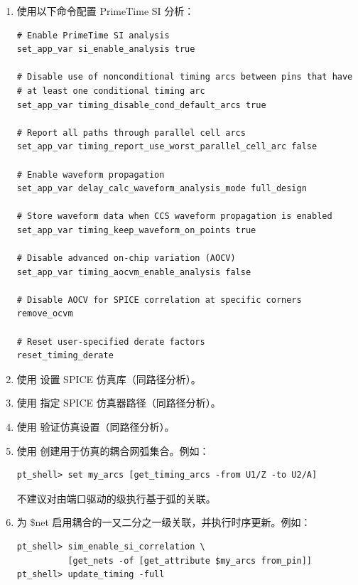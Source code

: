 \begin{enumerate}
  \item 使用以下命令配置 PrimeTime SI 分析：
\begin{lstlisting}
# Enable PrimeTime SI analysis
set_app_var si_enable_analysis true

# Disable use of nonconditional timing arcs between pins that have
# at least one conditional timing arc
set_app_var timing_disable_cond_default_arcs true

# Report all paths through parallel cell arcs
set_app_var timing_report_use_worst_parallel_cell_arc false

# Enable waveform propagation
set_app_var delay_calc_waveform_analysis_mode full_design

# Store waveform data when CCS waveform propagation is enabled
set_app_var timing_keep_waveform_on_points true

# Disable advanced on-chip variation (AOCV)
set_app_var timing_aocvm_enable_analysis false

# Disable AOCV for SPICE correlation at specific corners
remove_ocvm

# Reset user-specified derate factors
reset_timing_derate
\end{lstlisting}

  \item 使用  设置 SPICE 仿真库（同路径分析）。

  \item 使用  指定 SPICE 仿真器路径（同路径分析）。

  \item 使用  验证仿真设置（同路径分析）。

  \item 使用  创建用于仿真的耦合网弧集合。例如：
\begin{lstlisting}
pt_shell> set my_arcs [get_timing_arcs -from U1/Z -to U2/A]
\end{lstlisting}

\begin{noteBox}
不建议对由端口驱动的级执行基于弧的关联。
\end{noteBox}

  \item 为 \$net 启用耦合的一又二分之一级关联，并执行时序更新。例如：
\begin{lstlisting}
pt_shell> sim_enable_si_correlation \
          [get_nets -of [get_attribute $my_arcs from_pin]]
pt_shell> update_timing -full
\end{lstlisting}


\end{enumerate}
